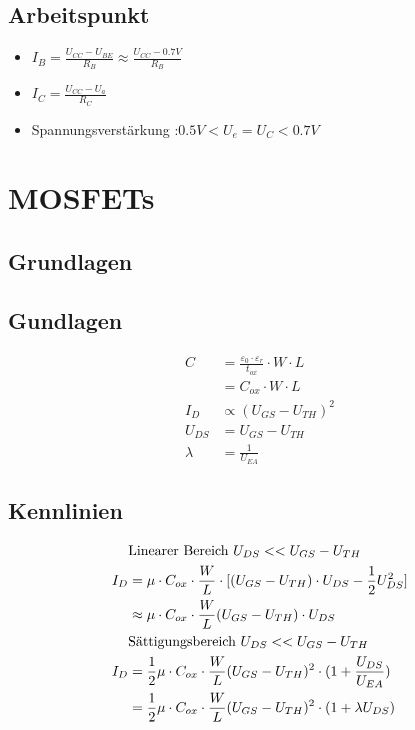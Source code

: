 \documentclass{article}
\begin{document}
\subsection*{Arbeitspunkt}
\begin{itemize}
    \item $I_B = \frac{U_{CC}-U_{BE}}{R_B}\approx\frac{U_{CC}-0.7V}{R_B}$
    \item $I_C = \frac{U_{CC}-U_a}{R_C}$
    \item Spannungsverstärkung :$0.5V < U_e = U_C <0.7V$
\end{itemize}
\section*{MOSFETs}

\subsection*{Grundlagen}
\begin{minipage}[t]{0.33\textwidth}
    \subsection*{Gundlagen}
        \begin{align*}
            C &= \frac{\varepsilon_0\cdot\varepsilon_r}{t_{ox}}\cdot W\cdot L \\
            &= C_{ox}\cdot W\cdot L\\
            I_D &\propto (U_{GS}-U_{TH})^2\\
            U_{DS} &= U_{GS}-U_{TH}\\
            \lambda &= \frac{1}{U_{EA}}
        \end{align*}
    \end{minipage}
    \begin{minipage}[t]{0.43\textwidth}
    \subsection*{Kennlinien}
        \begin{align*}
            &\text{Linearer Bereich }\space U_{DS}<< U_{GS}-U_{TH}\\
            I_D &= \mu\cdot C_{ox}\cdot \frac{W}{L}\cdot[(U_{GS}-U_{TH})\cdot U_{DS}-\frac12 U_{DS}^2]\\
            & \approx \mu \cdot C_{ox}\cdot \frac{W}{L} (U_{GS}-U_{TH})\cdot U_{DS} \\
            &\text{Sättigungsbereich }\space U_{DS}<< U_{GS}-U_{TH}\\
            I_D & = \frac12\mu \cdot C_{ox}\cdot \frac{W}{L} (U_{GS}-U_{TH})^2\cdot (1+\frac{U_{DS}}{U_{EA}})\\
            &=\frac12 \mu\cdot C_{ox}\cdot \frac{W}{L}(U_{GS}-U_{TH})^2\cdot(1+\lambda U_{DS})
        \end{align*}
    \end{minipage}
\end{document}
